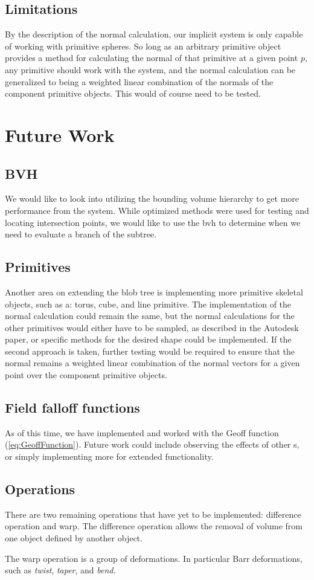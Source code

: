 \documentclass[conference]{acmsiggraph}
\begin{document}
\subsection{Limitations}
By the description of the normal calculation, our implicit system is only
capable of working with primitive spheres. So long as an arbitrary  primitive
object provides a method for calculating the normal of that primitive at a
given point $p$, any primitive should work with the system, and the normal
calculation can be generalized to being a weighted linear combination of the
normals of the component primitive objects. This would of course need to be
tested.

\section{Future Work}
\subsection{BVH}
We would like to look into utilizing the bounding volume hierarchy to get more
performance from the system. While optimized methods were used for testing and
locating intersection points, we would like to use the bvh to determine when we
need to evaluate a branch of the subtree.

\subsection{Primitives}
Another area on extending the blob tree is implementing more primitive skeletal
objects, such as a: torus, cube, and line primitive. The implementation of the
normal calculation could remain the same, but the normal calculations for the
other primitives would either have to be sampled, as described in the Autodesk
paper, or specific methods for the desired shape could be implemented. If the
second approach is taken, further testing would be required to ensure that the
normal remains a weighted linear combination of the normal vectors for a given
point over the component primitive objects.

\subsection{Field falloff functions}
As of this time, we have implemented and worked with the Geoff
function (\ref{eq:GeoffFunction}). Future work could include observing the effects
of other \fff s, or simply implementing more for extended functionality.

\subsection{Operations}
There are two remaining operations that have yet to be implemented: difference
operation and warp. The difference operation allows the removal of volume from
one object defined by another object.

The warp operation is a group of deformations. In particular Barr deformations,
such as \textit{twist}, \textit{taper}, and \textit{bend}.



\end{document}
